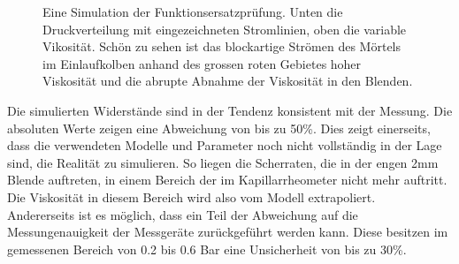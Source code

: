 \begin{figure}[htb]
    \centering
    \caption{Eine Simulation der Funktionsersatzprüfung. Unten die Druckverteilung mit eingezeichneten Stromlinien, oben die variable Vikosität. Schön zu sehen ist das blockartige Strömen des Mörtels im Einlaufkolben anhand des grossen roten Gebietes hoher Viskosität und die abrupte Abnahme der Viskosität in den Blenden.}
    \label{fig:fepSimResult}
\end{figure}

Die simulierten Widerstände sind in der Tendenz konsistent mit der Messung. Die absoluten Werte zeigen eine Abweichung von bis zu 50\%. Dies zeigt einerseits, dass die verwendeten Modelle und Parameter noch nicht vollständig in der Lage sind, die Realität zu simulieren. So liegen die Scherraten, die in der engen 2mm Blende auftreten, in einem Bereich der im Kapillarrheometer nicht mehr auftritt. Die Viskosität in diesem Bereich wird also vom Modell extrapoliert.\\
Andererseits ist es möglich, dass ein Teil der Abweichung auf die Messungenauigkeit der Messgeräte zurückgeführt werden kann. Diese besitzen im gemessenen Bereich von 0.2 bis 0.6 Bar eine Unsicherheit von bis zu 30\%.
%
